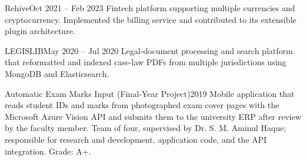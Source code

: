 %
%
%


\begin{projects}

    \project
        {Rehive}{Oct 2021 -- Feb 2023}
        {}
        {Fintech platform supporting multiple currencies and cryptocurrency. 
        Implemented the billing service and contributed to its extensible plugin architecture.}
        {}

    \project
        {LEGISLIB}{May 2020 -- Jul 2020}
        {}
        {Legal-document processing and search platform that reformatted and indexed case-law PDFs from multiple jurisdictions using MongoDB and Elasticsearch.}
        {}

    \project
        {Automatic Exam Marks Input (Final-Year Project)}{2019}
        {}
        {Mobile application that reads student IDs and marks from photographed exam
        cover pages with the Microsoft Azure Vision API and submits them to the
        university ERP after review by the faculty member. Team of four, supervised by
        Dr. S. M. Aminul Haque; responsible for research and development, application
        code, and the API integration. Grade: A+.}
        {}

\end{projects}
